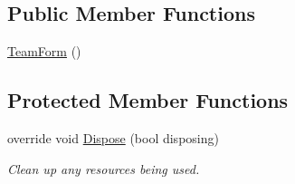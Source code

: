 \subsection*{Public Member Functions}
\begin{DoxyCompactItemize}
\item 
\hyperlink{classProject__Codename__Olympia__v1_1_1__0_1_1TeamForm_ac07503611629c22ffb825c90c7a6a474}{Team\+Form} ()
\end{DoxyCompactItemize}
\subsection*{Protected Member Functions}
\begin{DoxyCompactItemize}
\item 
override void \hyperlink{classProject__Codename__Olympia__v1_1_1__0_1_1TeamForm_a7896ce3551a76d8161138e412e507a17}{Dispose} (bool disposing)
\begin{DoxyCompactList}\small\item\em Clean up any resources being used. \end{DoxyCompactList}\end{DoxyCompactItemize}
